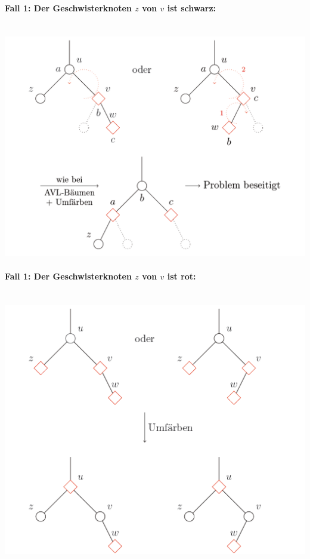 \documentclass{scrartcl}
\begin{document}
\paragraph{Fall 1: Der Geschwisterknoten $z$ von $v$ ist schwarz:} \ \\
\includegraphics[scale=0.4]{images/RS-Insert1.png}
\paragraph{Fall 1: Der Geschwisterknoten $z$ von $v$ ist rot:} \ \\
\includegraphics[scale=0.4]{images/RS-Insert2.png}
\end{document}
